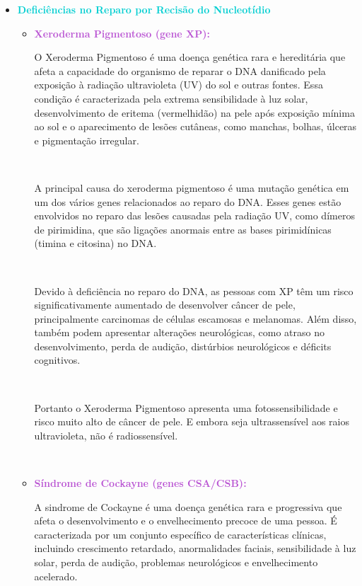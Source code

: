 \documentclass[11pt,a4paper]{article}
\begin{document}
	\begin{itemize}[label=\textcolor{CarnationPink}{$\blacktriangleright$}]
		\item \textcolor{DarkTurquoise}{\LobsterTwo\Large\textbf{Deficiências no Reparo por Recisão do Nucleotídio}}
		\begin{itemize}[label=\textcolor{CarnationPink}{$\star$}]
			\item \textcolor{MediumOrchid}{\large\textbf{Xeroderma Pigmentoso (gene XP):}} 
			
			O Xeroderma Pigmentoso é uma doença genética rara e hereditária que afeta a capacidade do organismo de reparar o DNA danificado pela exposição à radiação ultravioleta (UV) do sol e outras fontes. Essa condição é caracterizada pela extrema sensibilidade à luz solar, desenvolvimento de eritema (vermelhidão) na pele após exposição mínima ao sol e o aparecimento de lesões cutâneas, como manchas, bolhas, úlceras e pigmentação irregular.
			
			\

			A principal causa do xeroderma pigmentoso é uma mutação genética em um dos vários genes relacionados ao reparo do DNA. Esses genes estão envolvidos no reparo das lesões causadas pela radiação UV, como dímeros de pirimidina, que são ligações anormais entre as bases pirimidínicas (timina e citosina) no DNA.

			\

			Devido à deficiência no reparo do DNA, as pessoas com XP têm um risco significativamente aumentado de desenvolver câncer de pele, principalmente carcinomas de células escamosas e melanomas. Além disso, também podem apresentar alterações neurológicas, como atraso no desenvolvimento, perda de audição, distúrbios neurológicos e déficits cognitivos.
			
			\

			Portanto o Xeroderma Pigmentoso apresenta uma fotossensibilidade e risco muito alto de câncer de pele. E embora seja ultrassensível aos raios ultravioleta, não é radiossensível.
			
			\

			\item \textcolor{MediumOrchid}{\large\textbf{Síndrome de Cockayne (genes CSA/CSB):}}
			
			A sindrome de Cockayne é uma doença genética rara e progressiva que afeta o desenvolvimento e o envelhecimento precoce de uma pessoa. É caracterizada por um conjunto específico de características clínicas, incluindo crescimento retardado, anormalidades faciais, sensibilidade à luz solar, perda de audição, problemas neurológicos e envelhecimento acelerado.
			

\end{itemize}
\end{itemize}
\end{document}
